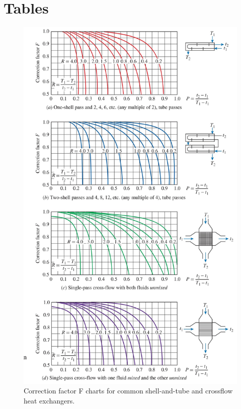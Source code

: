 \section*{Tables}
\begin{figure}[H]
    \centering
    \includegraphics[width=0.7\linewidth]{Figures/Sec11 11-9.jpg}
    \caption{Correction factor F charts for common 
    shell-and-tube and crossflow heat 
    exchangers.}
    \label{fig:sec11_correction_factor}
\end{figure}
\newpage
